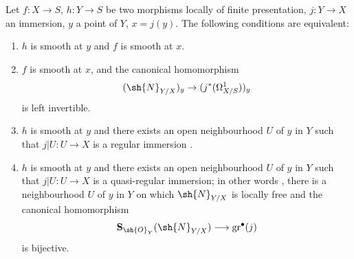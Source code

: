 \begin{theorem}[17.12.1]
\label{IV.17.12.1}
Let $f:X\to S$, $h:Y\to S$ be two morphisms locally of finite presentation, $j:Y\to X$ an immersion, $y$ a point of $Y$, $x=j(y)$.
The following conditions are equivalent:
\begin{enumerate}
  \item[a)] $h$ is smooth at $y$ and $f$ is smooth at $x$.
  \item[b)] $f$ is smooth at $x$, and the canonical homomorphism 
\[
(\sh{N}_{Y/X})_y \to (j^*(\Omega^1_{X/S}))_y
\]
is left invertible.
  \item[c)] $h$ is smooth at $y$ and there exists an open neighbourhood $U$ of $y$ in $Y$ such that $j|U:U\to X$ is a regular immersion .

  \item[c')] $h$ is smooth at $y$ and there exists an open neighbourhood $U$ of $y$ in $Y$ such that $j|U:U\to X$ is a quasi-regular immersion; in other words , there is a neighbourhood $U$ of $y$ in $Y$ on which $\sh{N}_{Y/X}$ is locally free and the canonical homomorphism
  \[
    \mathbf{S}_{\sh{O}_Y}(\sh{N}_{Y/X})
    \longrightarrow \operatorname{gr}^{\bullet}(j)
  \]
  is bijective.
\end{enumerate}
\end{theorem}

